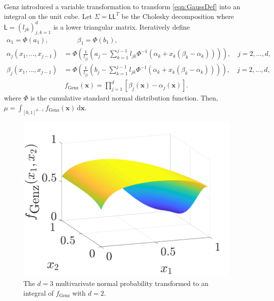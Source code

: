 \documentclass{iitthesis}          %
\newcommand{\bm}[1]{\boldsymbol{#1}}
\newcommand{\mSigma}{\mathsf{\Sigma}}
\newcommand{\dif}[1]{\text{d}{#1}}
\newcommand{\vx}{\bm{x}}
\newcommand{\dvx}{\dif{\bm{x}}}
\newcommand{\mL}{\mathsf{L}}
\begin{document}
Genz \cite{Gen93} introduced a variable transformation to transform \eqref{eqn:GaussDef} into an integral on the unit cube.  Let $\mSigma= \mL \mL^T$ be the Cholesky decomposition where $\mL = (l_{jk})_{j,k=1}^d$ is a lower triangular matrix.  Iteratively define
\begin{align*}
\alpha_1 = \Phi(a_1), 
&\qquad
\beta_1 = \Phi(b_1),
\\
\alpha_j(x_1,...,x_{j-1}) &= 
\Phi
\left(
\frac{1}{l_{jj}} 
\left(
a_j - \sum_{k=1}^{j-1} l_{jk} \Phi^{-1}(\alpha_k + x_k(\beta_k-\alpha_k))
\right)
\right), \quad j=2,...,d,
\\
\beta_j(x_1,...,x_{j-1}) &= 
\Phi
\left(
\frac{1}{l_{jj}} 
\left(
b_j - \sum_{k=1}^{j-1} l_{jk} \Phi^{-1}(\alpha_k + x_k(\beta_k-\alpha_k))
\right)
\right), \quad j=2,...,d,
\end{align*}
\begin{align}
\label{eqn:fGenzdef}
f_{\text{Genz}}(\vx) = \prod_{j=1}^d [\beta_j(\vx) - \alpha_j(\vx)].
\end{align}
where $\Phi$ is the cumulative standard normal distribution function.  Then, $\mu = \int_{[0,1]^{d-1}} f_{\text{Genz}}(\vx) \, \dvx$.

\begin{figure}
	\centering
		\includegraphics[width=0.9\linewidth]{GenzFunc_varTx_none}
	\caption{The $d=3$ multivarivate normal probability transformed to an integral of $f_{\text{Genz}}$ with  $d=2$.}
	\label{fig:MVN_Genz}
\end{figure}
\end{document}
